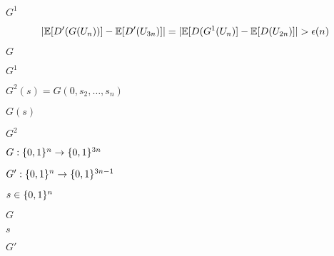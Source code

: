 \documentclass[10pt]{book}
\begin{document}
\begin{mdSnippets}
\begin{mdInlineSnippet}
$G^1$\end{mdInlineSnippet}%
\begin{mdDisplaySnippet}%
\[%
|\E[D'(G(U_n))] - \E[D'(U_{3n})]| = | \E[D(G^1(U_n)] - \E[D(U_{2n})] | > \epsilon(n) 
\]%
\end{mdDisplaySnippet}%
\begin{mdInlineSnippet}[dfcf28d0734569a6a693bc8194de62bf]%
$G$\end{mdInlineSnippet}%
\begin{mdInlineSnippet}%
$G^1$\end{mdInlineSnippet}%
\begin{mdInlineSnippet}[e7bd6948af90ee7b72f52fdb029b01fa]%
$G^2(s)=G(0,s_2,\ldots,s_n)$\end{mdInlineSnippet}%
\begin{mdInlineSnippet}%
$G(s)$\end{mdInlineSnippet}%
\begin{mdInlineSnippet}[c6c801b451c5120d54e7f6e66b38b71a]%
$G^2$\end{mdInlineSnippet}%
\begin{mdInlineSnippet}[bb1eab31b1f320303597d30139786735]%
$G: \{0,1\}^n \to \{0,1\}^{3n}$\end{mdInlineSnippet}%
\begin{mdInlineSnippet}[78725d076aa4f27d03ddeed139e02372]%
$G': \{0,1\}^n \to \{0,1\}^{3n - 1}$\end{mdInlineSnippet}%
\begin{mdInlineSnippet}%
$s \in \{0,1\}^n$\end{mdInlineSnippet}%
\begin{mdInlineSnippet}[dfcf28d0734569a6a693bc8194de62bf]%
$G$\end{mdInlineSnippet}%
\begin{mdInlineSnippet}[03c7c0ace395d80182db07ae2c30f034]%
$s$\end{mdInlineSnippet}%
\begin{mdInlineSnippet}[b1c5660b1392ecb094b31a0e42253ff9]%
$G'$\end{mdInlineSnippet}%
\begin{mdInlineSnippet}[c0375751efd34e439217b2c128f90009]%

\end{mdInlineSnippet}
\end{mdSnippets}
\end{document}
